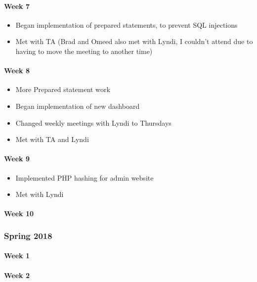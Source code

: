 \documentclass[onecolumn, draftclsnofoot,10pt, compsoc]{IEEEtran}
\begin{document}
      \paragraph{Week 7}
        \begin{itemize}
          \item Began implementation of prepared statements, to prevent SQL injections
          \item Met with TA (Brad and Omeed also met with Lyndi, I couldn't attend due to having to move the meeting to another time)
        \end{itemize}

      \paragraph{Week 8}
        \begin{itemize}
          \item More Prepared statement work
          \item Began implementation of new dashboard
          \item Changed weekly meetings with Lyndi to Thursdays
          \item Met with TA and Lyndi
        \end{itemize}

      \paragraph{Week 9}
        \begin{itemize}
          \item Implemented PHP hashing for admin website
          \item Met with Lyndi
        \end{itemize}

      \paragraph{Week 10}

    \subsubsection{Spring 2018}
      \paragraph{Week 1}
      \paragraph{Week 2}
\end{document}
